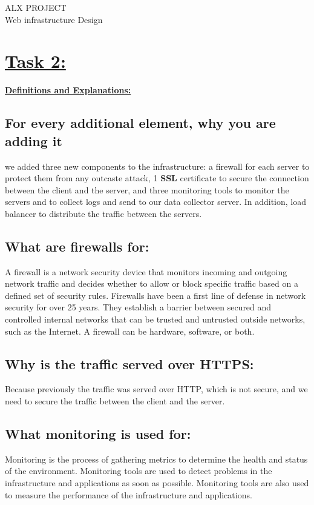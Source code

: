 \documentclass[a4paper, 10pt]{article}
\begin{document}
\justifying
    \begin{center}
        ALX PROJECT \\
        Web infrastructure Design 
    \end{center}
\section*{\underline{Task 2:}}
    \textbf{\underline{Definitions and Explanations:}}
    \subsection*{For every additional element, why you are adding it}
        we added three new components to the infrastructure:
        a firewall for each server to protect them from any outcaste attack, 1 \textbf{SSL} certificate to 
        secure the connection between the client and the server, and three monitoring tools to monitor the servers and
        to collect logs and send to our data collector server. In addition, load balancer to distribute the traffic between the servers.
    \subsection*{What are firewalls for: }
        A firewall is a network security device that monitors incoming and outgoing network traffic and decides whether to allow or block specific traffic based on a defined set of security rules.
        Firewalls have been a first line of defense in network security for over 25 years. They establish a barrier between secured and controlled internal networks that can be trusted and untrusted outside networks, such as the Internet.
        A firewall can be hardware, software, or both.
    \subsection*{Why is the traffic served over HTTPS: }
        Because previously the traffic was served over HTTP, which is not secure,
        and we need to secure the traffic between the client and the server.
    \subsection*{What monitoring is used for: }
        Monitoring is the process of gathering metrics to determine the health and status of the 
        environment. Monitoring tools are used to detect problems in the infrastructure and 
        applications as soon as possible. Monitoring tools are also used to measure the performance 
        of the infrastructure and applications.
\end{document}
